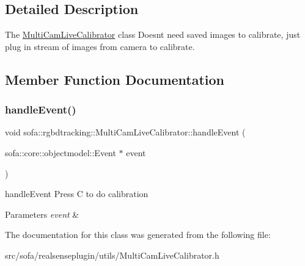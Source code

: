 \subsection{Detailed Description}
The \hyperlink{classsofa_1_1rgbdtracking_1_1_multi_cam_live_calibrator}{Multi\+Cam\+Live\+Calibrator} class Doesn\textquotesingle{}t need saved images to calibrate, just plug in stream of images from camera to calibrate. 

\subsection{Member Function Documentation}
\mbox{\label{classsofa_1_1rgbdtracking_1_1_multi_cam_live_calibrator_a55eaadf487e62562e626cb15598f3f3b}} 
\subsubsection{\texorpdfstring{handle\+Event()}{handleEvent()}}
{\footnotesize\ttfamily void sofa\+::rgbdtracking\+::\+Multi\+Cam\+Live\+Calibrator\+::handle\+Event (\begin{DoxyParamCaption}\item[{sofa\+::core\+::objectmodel\+::\+Event $\ast$}]{event }\end{DoxyParamCaption})\hspace{0.3cm}{\ttfamily [inline]}}



handle\+Event Press C to do calibration 


\begin{DoxyParams}{Parameters}
{\em event} & \\
\hline
\end{DoxyParams}


The documentation for this class was generated from the following file\+:\begin{DoxyCompactItemize}
\item 
src/sofa/realsenseplugin/utils/Multi\+Cam\+Live\+Calibrator.\+h\end{DoxyCompactItemize}
